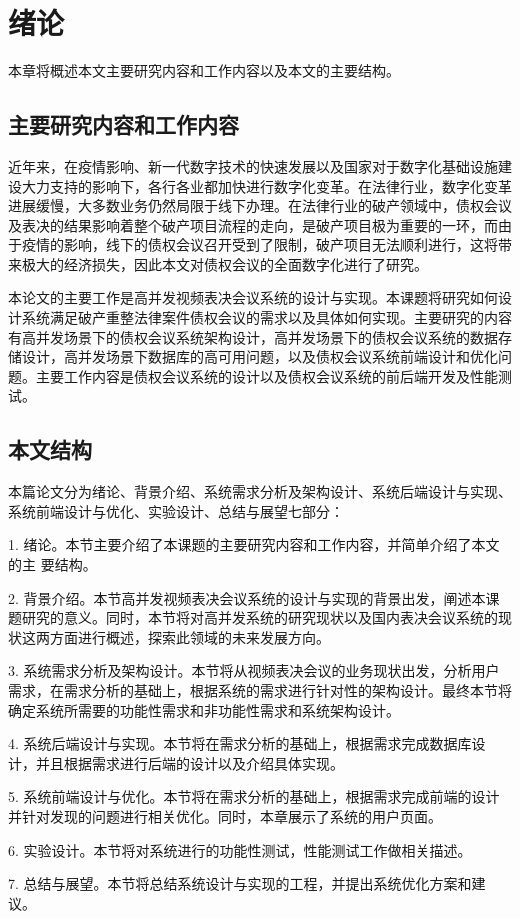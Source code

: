 
\chapter{绪论}
本章将概述本文主要研究内容和工作内容以及本文的主要结构。

\section{主要研究内容和工作内容}
近年来，在疫情影响、新一代数字技术的快速发展以及国家对于数字化基础设施建设大力支持的影响下，各行各业都加快进行数字化变革。在法律行业，数字化变革进展缓慢，大多数业务仍然局限于线下办理。在法律行业的破产领域中，债权会议及表决的结果影响着整个破产项目流程的走向，是破产项目极为重要的一环，而由于疫情的影响，线下的债权会议召开受到了限制，破产项目无法顺利进行，这将带来极大的经济损失，因此本文对债权会议的全面数字化进行了研究。

本论文的主要工作是高并发视频表决会议系统的设计与实现。本课题将研究如何设计系统满足破产重整法律案件债权会议的需求以及具体如何实现。主要研究的内容有高并发场景下的债权会议系统架构设计，高并发场景下的债权会议系统的数据存储设计，高并发场景下数据库的高可用问题，以及债权会议系统前端设计和优化问题。主要工作内容是债权会议系统的设计以及债权会议系统的前后端开发及性能测试。

\section{本文结构}
本篇论文分为绪论、背景介绍、系统需求分析及架构设计、系统后端设计与实现、系统前端设计与优化、实验设计、总结与展望七部分：

1. 绪论。本节主要介绍了本课题的主要研究内容和工作内容，并简单介绍了本文的主
要结构。

2. 背景介绍。本节高并发视频表决会议系统的设计与实现的背景出发，阐述本课题研究的意义。同时，本节将对高并发系统的研究现状以及国内表决会议系统的现状这两方面进行概述，探索此领域的未来发展方向。

3. 系统需求分析及架构设计。本节将从视频表决会议的业务现状出发，分析用户需求，在需求分析的基础上，根据系统的需求进行针对性的架构设计。最终本节将确定系统所需要的功能性需求和非功能性需求和系统架构设计。

4. 系统后端设计与实现。本节将在需求分析的基础上，根据需求完成数据库设计，并且根据需求进行后端的设计以及介绍具体实现。

5. 系统前端设计与优化。本节将在需求分析的基础上，根据需求完成前端的设计并针对发现的问题进行相关优化。同时，本章展示了系统的用户页面。

6. 实验设计。本节将对系统进行的功能性测试，性能测试工作做相关描述。

7. 总结与展望。本节将总结系统设计与实现的工程，并提出系统优化方案和建议。


